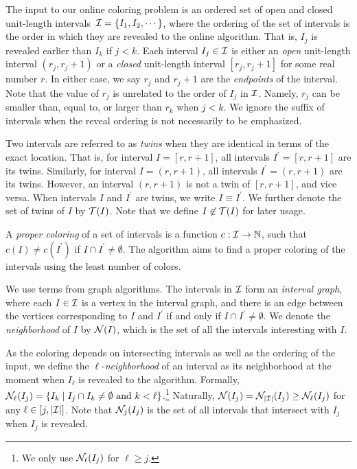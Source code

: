 
The input to our online coloring problem is an ordered set of open and closed unit-length intervals~$\mathcal{I} = \{I_1, I_2, \cdots\}$, where the ordering of the set of intervals is the order in which they are revealed to the online algorithm. 
That is, $I_j$ is revealed earlier than $I_k$ if $j<k$.
Each interval $I_j\in \mathcal{I}$ is either an \emph{open} unit-length interval $(r_j, r_j+1)$ or a \emph{closed} unit-length interval $[r_j, r_j+1]$ for some real number $r$.
In either case, we say $r_j$ and $r_j+1$ are the \emph{endpoints} of the interval. 
Note that the value of $r_j$ is unrelated to the order of $I_j$ in $\mathcal{I}$.
Namely, $r_j$ can be smaller than, equal to, or larger than $r_k$ when $j<k$.
We ignore the suffix of intervals when the reveal ordering is not necessarily to be emphasized.


Two intervals are referred to as \emph{twins} when they are identical in terms of the exact location.
That is, for interval $I = [r, r+1]$, all intervals $I^\prime = [r, r+1]$ are its twins. 
Similarly, for interval $I = (r, r+1)$, all intervals $I^\prime = (r, r+1)$ are its twins.
However, an interval $(r,r+1)$ is not a twin of $[r, r+1]$, and vice versa.
When intervals $I$ and $I^\prime$ are twins, we write $I \equiv I^\prime$.
We further denote the set of twins of $I$ by $\mathcal{T}(I)$.
Note that we define $I \not \in \mathcal{T}(I)$ for later usage.


A \emph{proper coloring} of a set of intervals is a function $c : \mathcal{I} \rightarrow \mathbb{N}$, such that $c(I) \neq c(I^\prime)$ if $I \cap I^\prime \neq \emptyset$.
The algorithm aims to find a proper coloring of the intervals using the least number of colors.


We use terms from graph algorithms. 
The intervals in $\mathcal{I}$ form an \emph{interval graph}, where each $I\in \mathcal{I}$ is a vertex in the interval graph, and there is an edge between the vertices corresponding to $I$ and $I^\prime$ if and only if $I \cap I^\prime \neq \emptyset$.
We denote the \emph{neighborhood} of $I$ by $\mathcal{N}(I)$, which is the set of all the intervals interesting with $I$.

As the coloring depends on intersecting intervals as well as the ordering of the input, we define the $\ell$-\emph{neighborhood} of an interval as its neighborhood at the moment when $I_\ell$ is revealed to the algorithm.
Formally, $\mathcal{N}_\ell(I_j) = \{ I_k \mid I_j \cap I_k \neq \emptyset \text{ and } k < \ell \}$.\footnote{We only use $\mathcal{N}_\ell(I_j)$ for $\ell \geq j$.}
Naturally, $\mathcal{N}(I_j) = \mathcal{N}_{|\mathcal{I}|}(I_j) \geq \mathcal{N}_\ell(I_j)$ for any $\ell \in [j,|\mathcal{I}|]$.
Note that $\mathcal{N}_j(I_j)$ is the set of all intervals that intersect with $I_j$ when $I_j$ is revealed.

